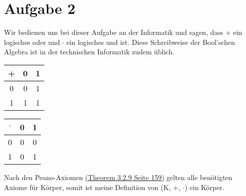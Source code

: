 \section{Aufgabe 2}
    Wir bedienen uns bei dieser Aufgabe an der Informatik und sagen, dass + ein logisches oder und $\cdot$ ein logisches und ist. Diese Schreibweise der Bool'schen Algebra ist in der technischen Informatik zudem üblich. \\
    \begin{center}
        \begin{tabular}{c|c|c}
             + & 0 & 1\\
             \hline
             0 & 0 & 1\\
             \hline
             1 & 1 & 1
        \end{tabular}
        \hspace{2cm}
        \begin{tabular}{c|c|c}
             $\cdot$& 0 & 1\\
             \hline
             0 & 0 & 0 \\
             \hline
             1 & 0 & 1
        \end{tabular} 
    \end{center}

    Nach den Peano-Axiomen \href{https://link.springer.com/book/10.1007/978-3-658-36659-9}{(Theorem 3.2.9 Seite 159)} gelten alle benötigten Axiome für Körper, somit ist meine Definition von (K, +, $\cdot$) ein Körper.